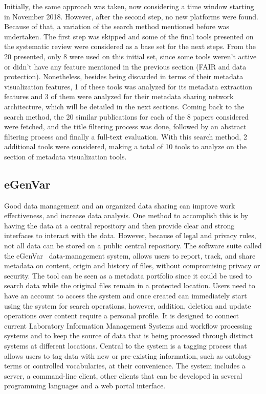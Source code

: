 Initially, the same approach was taken, now considering a time window starting in November 2018.
However, after the second step, no new platforms were found.
Because of that, a variation of the search method mentioned before was undertaken.
The first step was skipped and some of the final tools presented on the systematic review were considered as a base set for the next steps.
From the 20 presented, only 8 were used on this initial set, since some tools weren't active or didn't have any feature mentioned in the previous section (FAIR and data protection).
Nonetheless, besides being discarded in terms of their metadata visualization features, 1 of these tools was analyzed for its metadata extraction features and 3 of them were analyzed for their metadata sharing network architecture, which will be detailed in the next sections.
Coming back to the search method, the 20 similar publications for each of the 8 papers considered were fetched, and the title filtering process was done, followed by an abstract filtering process and finally a full-text evaluation.
With this search method, 2 additional tools were considered, making a total of 10 tools to analyze on the section of metadata visualization tools.

\subsection*{eGenVar}

Good data management and an organized data sharing can improve work effectiveness, and increase data analysis.
One method to accomplish this is by having the data at a central repository and then provide clear and strong interfaces to interact with the data.
However, because of legal and privacy rules, not all data can be stored on a public central repository.
The software suite called the eGenVar~\cite{egenvar} data-management system, allows users to report, track, and share metadata on content, origin and history of files, without compromising privacy or security.
The tool can be seen as a metadata portfolio since it could be used to search data while the original files remain in a protected location.
Users need to have an account to access the system and once created can immediately start using the system for search operations, however, addition, deletion and update operations over content require a personal profile.
It is designed to connect current Laboratory Information Management Systems and workflow processing systems and to keep the source of data that is being processed through distinct systems at different locations.
Central to the system is a tagging process that allows users to tag data with new or pre-existing information, such as ontology terms or controlled vocabularies, at their convenience.
The system includes a server, a command-line client, other clients that can be developed in several programming languages and a web portal interface.

